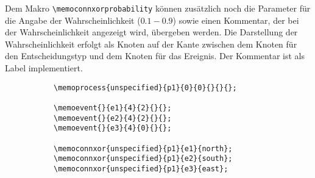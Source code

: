 \noindent Dem Makro \lstinline|\memoconnxorprobability| können zusätzlich noch die Parameter für die Angabe der Wahrscheinlichkeit ($0.1 - 0.9$) sowie einen Kommentar, der bei der Wahrscheinlichkeit angezeigt wird, übergeben werden. Die Darstellung der Wahrscheinlichkeit erfolgt als Knoten auf der Kante zwischen dem Knoten für den Entscheidungstyp und dem Knoten für das Ereignis. Der Kommentar ist als Label implementiert.\\
\begin{figure}[htbp]
    \centering
    \caption[Beispiel: Produktion eines alternativen Ereignisses ohne Wahrscheinlichkeit.]{Beispiel: Produktion eines alternativen Ereignisses ohne Wahrscheinlichkeit.}
    \begin{subfigure}{0.4\textwidth}
        \centering
    \end{subfigure}
    \begin{subfigure}{0.6\textwidth}
        \centering
        \begin{lstlisting}
\memoprocess{unspecified}{p1}{0}{0}{}{}{};
                 
\memoevent{}{e1}{4}{2}{}{};       
\memoevent{}{e2}{4}{2}{}{};
\memoevent{}{e3}{4}{0}{}{}; 
            
\memoconnxor{unspecified}{p1}{e1}{north};
\memoconnxor{unspecified}{p1}{e2}{south};
\memoconnxor{unspecified}{p1}{e3}{east};            
        \end{lstlisting}
    \end{subfigure}
    \label{fig:EntscheidungOhne}
\end{figure}

\noindent\DescribeMacro{\memoiterationuntil}\\\newline
\DescribeMacro{\memoiterationloop}\\\medskip

